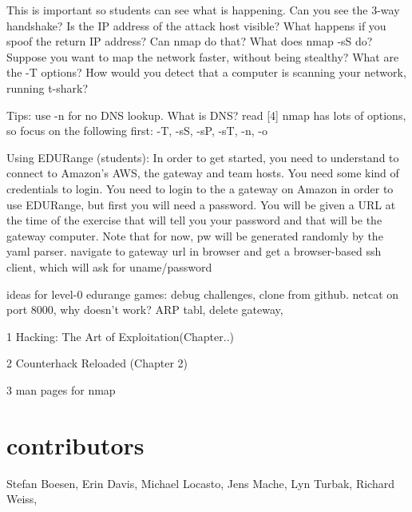 \documentclass[11pt]{report}
\begin{document}
This is important so students can see what is happening.
Can you see the 3-way handshake?  Is the IP address of the attack host visible?
What happens if you spoof the return IP address?  Can nmap do that?
What does nmap -sS do?
Suppose you want to map the network faster, without being stealthy?  What are the -T options?
How would you detect that a computer is scanning your network, running t-shark?

Tips: use -n for no DNS lookup.  What is DNS? read [4]
nmap has lots of options, so focus on the following first: -T, -sS, -sP, -sT, -n, -o


Using EDURange (students): 
In order to get started, you need to understand to connect to Amazon's AWS, the gateway and team hosts.
You need some kind of credentials to login.  You need to login to the a gateway on Amazon in order to use 
EDURange, but first you will need a password.  You will be given a URL at the time of the exercise that will 
tell you your password and that will be the gateway computer.
Note that for now, pw will be generated randomly by the yaml parser.
navigate to gateway url in browser and get a browser-based ssh client,  which will ask for uname/password

ideas for level-0 edurange games: debug challenges, clone from github.  netcat on port 8000, why doesn't work? 
ARP tabl, delete gateway,






1 Hacking: The Art of Exploitation(Chapter..)

2 Counterhack Reloaded (Chapter 2)

3 man pages for nmap


\section*{contributors}
Stefan Boesen, Erin Davis, Michael Locasto, Jens Mache,  Lyn Turbak, Richard Weiss, 

%
%
\end{document}
